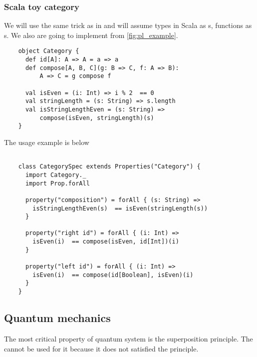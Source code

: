 \subsubsection{\textbf{Scala} toy category}
\begin{example}
  \label{ex:scalacategory}

  We will use the same trick as in  and
  will assume 
  types in Scala as s, 
  functions as s.
  We also are going to implement
   from \cref{fig:pl_example}.

  \begin{verbatim}
    object Category {
      def id[A]: A => A = a => a
      def compose[A, B, C](g: B => C, f: A => B): 
          A => C = g compose f 
      
      val isEven = (i: Int) => i % 2  == 0
      val stringLength = (s: String) => s.length
      val isStringLengthEven = (s: String) => 
          compose(isEven, stringLength)(s)
    }
  \end{verbatim}

  The usage example is below
  \begin{verbatim}
    
    class CategorySpec extends Properties("Category") {
      import Category._
      import Prop.forAll
      
      property("composition") = forAll { (s: String) =>
        isStringLengthEven(s)  == isEven(stringLength(s))
      }
      
      property("right id") = forAll { (i: Int) =>
        isEven(i)  == compose(isEven, id[Int])(i)
      }
      
      property("left id") = forAll { (i: Int) =>
        isEven(i)  == compose(id[Boolean], isEven)(i)
      }
    }
  \end{verbatim}
\end{example}


\subsection{Quantum mechanics}
The most critical property of quantum system is the superposition
principle. The  cannot be used for it
because it does not satisfied the principle. 

